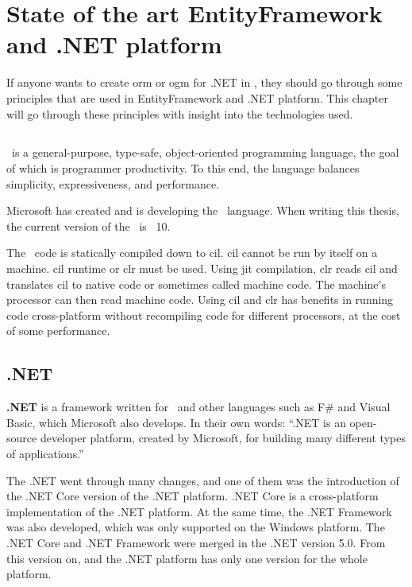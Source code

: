 \chapter {State of the art EntityFramework and .NET platform}

If anyone wants to create \acrshort{orm} or \acrshort{ogm} for .NET in \CS, they should go through some principles that are used in EntityFramework and .NET platform.
This chapter will go through these principles with insight into the technologies used.

\section {\CS}
\CS\ is a general-purpose, type-safe, object-oriented programming language, the goal of which is programmer productivity.
To this end, the language balances simplicity, expressiveness, and performance. \cite{albahari_c_2019}

Microsoft has created and is developing the \CS\ language. When writing this thesis, the current version of the \CS\ is \CS\ 10.

The \CS\ code is statically compiled down to \acrlong{cil}. \acrshort{cil} cannot be run by itself on a machine.
\acrshort{cil} runtime or \acrfull{clr} must be used.
Using \acrfull{jit} compilation, \acrshort{clr} reads \acrshort{cil} and translates \acrshort{cil} to native code or sometimes called machine code.
The machine's processor can then read machine code. Using \acrshort{cil} and \acrshort{clr} has benefits in running code cross-platform without recompiling code for different processors, at the cost of some performance. \cite{rodenburg_code_2021}

\section {.NET}

\textbf{.NET} is a framework written for \CS\ and other languages such as F\# and Visual Basic, which Microsoft also develops.
In their own words: ``.NET is an open-source developer platform, created by Microsoft, for building many different types of applications.'' \cite{microsoft_what_nodate}

The .NET went through many changes, and one of them was the introduction of the .NET Core version of the .NET platform.
.NET Core is a cross-platform implementation of the .NET platform. At the same time, the .NET Framework was also developed, which was only supported on the Windows platform.
The .NET Core and .NET Framework were merged in the .NET version 5.0.
From this version on, and the .NET platform has only one version for the whole platform.

